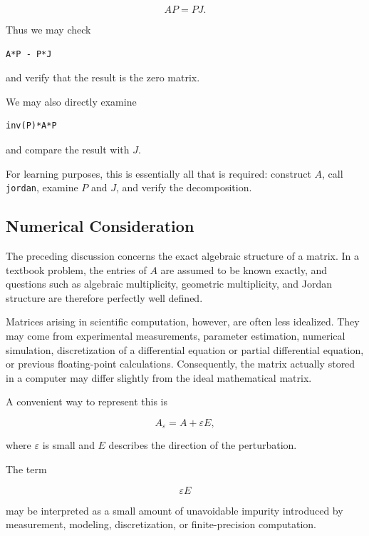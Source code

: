 \documentclass[11pt]{article}
\begin{document}
\[
AP=PJ.
\]

Thus we may check

\begin{verbatim}
A*P - P*J
\end{verbatim}

and verify that the result is the zero matrix.

We may also directly examine

\begin{verbatim}
inv(P)*A*P
\end{verbatim}

and compare the result with \(J\).

For learning purposes, this is essentially all that is required:
construct \(A\), call \texttt{jordan}, examine \(P\) and \(J\), and
verify the decomposition.


\subsection{Numerical Consideration}

The preceding discussion concerns the exact algebraic structure of a
matrix.  In a textbook problem, the entries of \(A\) are assumed to be
known exactly, and questions such as algebraic multiplicity, geometric
multiplicity, and Jordan structure are therefore perfectly well
defined.

Matrices arising in scientific computation, however, are often less
idealized.  They may come from experimental measurements, parameter
estimation, numerical simulation, discretization of a differential
equation or partial differential equation, or previous floating-point calculations.  Consequently, the
matrix actually stored in a computer may differ slightly from the ideal
mathematical matrix.

A convenient way to represent this is

\[
\boxed{
A_{\varepsilon}=A+\varepsilon E,
}
\]

where \(\varepsilon\) is small and \(E\) describes the direction of the
perturbation.

The term

\[
\varepsilon E
\]

may be interpreted as a small amount of unavoidable impurity introduced
by measurement, modeling, discretization, or finite-precision
computation.
\end{document}

